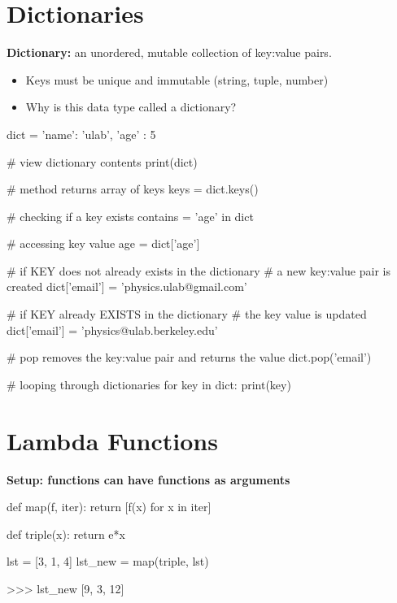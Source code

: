 \documentclass[12pt]{article}
\numberwithin{equation}{section}
\begin{document}
\section{Dictionaries}
\textbf{Dictionary: }an unordered, mutable collection of key:value pairs. 
\begin{itemize}
    \item Keys must be unique and immutable (string, tuple, number)
    \item Why is this data type called a dictionary?
\end{itemize}
\begin{python}
dict = {
    'name': 'ulab',
    'age' : 5
}
\end{python}
\begin{python}
# view dictionary contents
print(dict)

# method returns array of keys
keys = dict.keys()

# checking if a key exists
contains = 'age' in dict

# accessing key value
age = dict['age']

# if KEY does not already exists in the dictionary
# a new key:value pair is created
dict['email'] = 'physics.ulab@gmail.com'

# if KEY already EXISTS in the dictionary
# the key value is updated
dict['email'] = 'physics@ulab.berkeley.edu'

# pop removes the key:value pair and returns the value
dict.pop('email')

# looping through dictionaries
for key in dict:
    print(key)

\end{python}

\section{Lambda Functions}

\textbf{Setup: functions can have functions as arguments}
\begin{python}
def map(f, iter):
    return [f(x) for x in iter]
    
def triple(x):
    return e*x

lst = [3, 1, 4]
lst_new = map(triple, lst)

>>> lst_new
[9, 3, 12]
\end{python}
\end{document}
